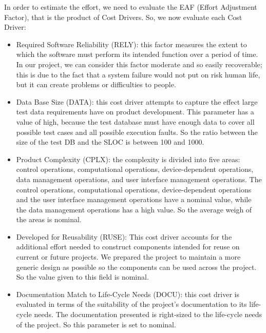 \label{cost-driver}

In order to estimate the effort, we need to evaluate the EAF (Effort Adjustment Factor), that is the product of Cost Drivers. \newline
So, we now evaluate each Cost Driver:
\begin{itemize}
    \item Required Software Reliability (RELY): this factor measures the extent to which the software must perform its intended function over a period of time.
        \newline 
        In our project, we can consider this factor moderate and so easily recoverable; this is due to the fact that a system failure would not put on risk human life, but it can create problems or difficulties to people.
    \item Data Base Size (DATA): this cost driver attempts to capture the effect large test data requirements have on product development.
        \newline
        This parameter has a value of high, because the test database must have enough data to cover all possible test cases and all possible execution faults. So the ratio between the size of the test DB and the SLOC is between 100 and 1000. 
    \item Product Complexity (CPLX): the complexity is divided into five areas: control operations, computational operations, device-dependent operations, data management operations, and user interface management operations.
        \newline 
        The control operations, computational operations, device-dependent operations and the user interface management operations have a nominal value, while the data management operations has a high value. So the average weigh of the areas is nominal.
    \item Developed for Reusability (RUSE): This cost driver accounts for the additional effort needed to construct components intended for reuse on current or future projects.
        \newline
        We prepared the project to maintain a more generic design as possible so the components can be used across the project. So the value given to this field is nominal. 
    \item Documentation Match to Life-Cycle Needs (DOCU): this cost driver is evaluated in terms of the suitability of the project’s documentation to its life-cycle needs.
        \newline
        The documentation presented is right-sized to the life-cycle needs of the project. So this parameter is set to nominal. 

\end{itemize}
